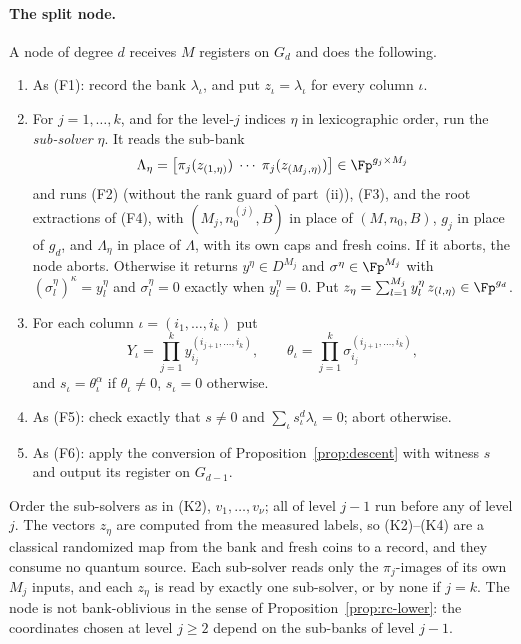 \paragraph{The split node.} A node of degree $d$ receives $M$ registers on $G_d$ and does the following.
\begin{enumerate}[label=(K\arabic*),leftmargin=3em]
  \item As (F1): record the bank $\lambda_\iota$, and put $z_\iota = \lambda_\iota$ for every column $\iota$.
  \item For $j = 1,\dots,k$, and for the level-$j$ indices $\eta$ in lexicographic order, run the \emph{sub-solver} $\eta$. It reads the sub-bank
  \[
    \Lambda_\eta = \bigl[\pi_j(z_{(1,\eta)}) \;\cdots\; \pi_j(z_{(M_j,\eta)})\bigr] \in \Fp^{g_j\times M_j}
  \]
  and runs (F2) (without the rank guard of part~(ii)), (F3), and the root extractions of (F4), with $(M_j, n_0^{(j)}, B)$ in place of $(M, n_0, B)$, $g_j$ in place of $g_d$, and $\Lambda_\eta$ in place of $\Lambda$, with its own caps and fresh coins. If it aborts, the node aborts. Otherwise it returns $y^\eta \in D^{M_j}$ and $\sigma^\eta \in \Fp^{M_j}$ with $(\sigma^\eta_l)^\kappa = y^\eta_l$ and $\sigma^\eta_l = 0$ exactly when $y^\eta_l = 0$. Put $z_\eta = \sum_{l=1}^{M_j} y^\eta_l\, z_{(l,\eta)} \in \Fp^{g_d}$.
  \item For each column $\iota = (i_1,\dots,i_k)$ put
  \[
    Y_\iota = \prod_{j=1}^k y^{(i_{j+1},\dots,i_k)}_{i_j}, \qquad
    \theta_\iota = \prod_{j=1}^k \sigma^{(i_{j+1},\dots,i_k)}_{i_j},
  \]
  and $s_\iota = \theta_\iota^\alpha$ if $\theta_\iota \ne 0$, $s_\iota = 0$ otherwise.
  \item As (F5): check exactly that $s \ne 0$ and $\sum_\iota s_\iota^d\lambda_\iota = 0$; abort otherwise.
  \item As (F6): apply the conversion of Proposition~\ref{prop:descent} with witness $s$ and output its register on $G_{d-1}$.
\end{enumerate}
Order the sub-solvers as in (K2), $v_1,\dots,v_\nu$; all of level $j-1$ run before any of level $j$. The vectors $z_\eta$ are computed from the measured labels, so (K2)--(K4) are a classical randomized map from the bank and fresh coins to a record, and they consume no quantum source. Each sub-solver reads only the $\pi_j$-images of its own $M_j$ inputs, and each $z_\eta$ is read by exactly one sub-solver, or by none if $j = k$. The node is not bank-oblivious in the sense of Proposition~\ref{prop:rc-lower}: the coordinates chosen at level $j \ge 2$ depend on the sub-banks of level $j-1$.

